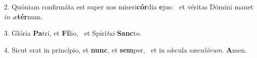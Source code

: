 2. Quóniam confirmáta est super nos miseri\textbf{cór}dia \textbf{e}jus: \ast\  et véritas Dómini manet \textit{in} \textit{æ}\textbf{tér}num.\

3. Glória \textbf{Pa}tri, et \textbf{Fí}lio, \ast\  et Spirí\textit{tu}\textit{i} \textbf{Sanc}to.\

4. Sicut erat in princípio, et \textbf{nunc}, et \textbf{sem}per, \ast\  et in sǽcula sæcu\textit{ló}\textit{rum}. \textbf{A}men.\

